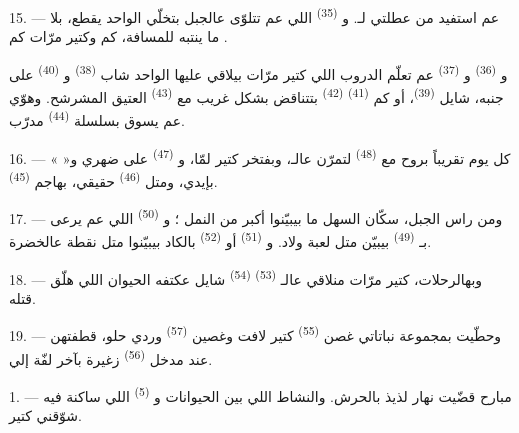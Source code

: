 \VUsaut{3.0mm}
\VUsaut{3.0mm}

15. --- عم استفيد من عطلتي لـ. و
\textsuperscript{(35)} اللي عم تتلوّى عالجبل بتخلّي الواحد يقطع، بلا ما
ينتبه للمسافة، كم  وكتير مرّات كم .

و \textsuperscript{(36)} و
\textsuperscript{(37)} عم تعلّم الدروب اللي كتير مرّات بيلاقي عليها
الواحد شاب  \textsuperscript{(38)} و
\textsuperscript{(40)} على جنبه، شايل 
\textsuperscript{(39)}، أو كم  \textsuperscript{(41)}
 \textsuperscript{(42)} بتتناقض بشكل غريب مع
 \textsuperscript{(43)} العتيق المشرشح. وهوّي عم يسوق
بسلسلة  \textsuperscript{(44)} مدرّب.

\VUsaut{3.0mm}

16. --- كل يوم تقريباً بروح مع  \textsuperscript{(48)}
لتمرّن عالـ، وبفتخر كتير لمّا، و
\textsuperscript{(47)} على ضهري و«  » بإيدي، ومتل
 \textsuperscript{(46)} حقيقي، بهاجم 
\textsuperscript{(45)}.

17. --- ومن راس الجبل، سكّان السهل ما بيبيّنوا أكبر من النمل ؛
و \textsuperscript{(50)} اللي عم يرعى بـ
\textsuperscript{(49)} بيبيّن متل لعبة ولاد. و
\textsuperscript{(51)} أو  \textsuperscript{(52)} بالكاد
بيبيّنوا متل نقطة عالخضرة.

18. --- وبهالرحلات، كتير مرّات منلاقي عالـ
\textsuperscript{(53)}  \textsuperscript{(54)} شايل
عكتفه الحيوان اللي هلّق قتله.

19. --- وحطّيت بمجموعة نباتاتي غصن  \textsuperscript{(55)}
كتير لافت وغصين  \textsuperscript{(57)} وردي حلو، قطفتهن عند
مدخل  \textsuperscript{(56)} زغيرة بآخر لفّة إلي.

\VUsaut{3.0mm}
\VUsaut{3.0mm}

\VUsaut{3.0mm}

1. --- مبارح قضّيت نهار لذيذ بالحرش. والنشاط اللي بين الحيوانات
و \textsuperscript{(5)} اللي ساكنة فيه شوّقني كتير.

